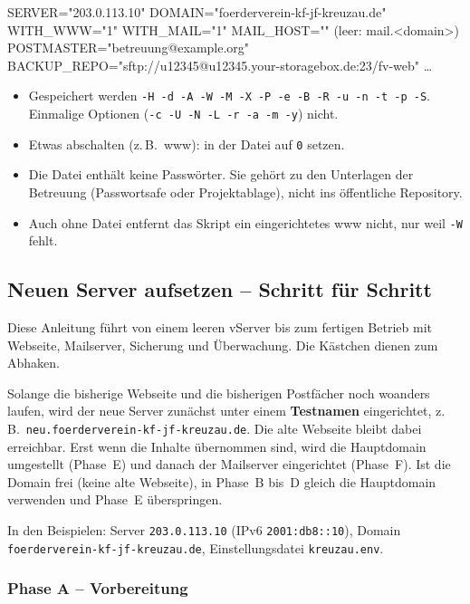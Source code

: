 \documentclass[a4paper,fontsize=10pt]{scrartcl}
\newcommand*{\cmd}[1]{\texttt{#1}}
\newcommand*{\pfad}[1]{\texttt{#1}}
\begin{document}
\begin{befehl}
SERVER="203.0.113.10"
DOMAIN="foerderverein-kf-jf-kreuzau.de"
WITH_WWW="1"
WITH_MAIL="1"
MAIL_HOST=""                       (leer: mail.<domain>)
POSTMASTER="betreuung@example.org"
BACKUP_REPO="sftp://u12345@u12345.your-storagebox.de:23/fv-web"
…
\end{befehl}

\begin{itemize}
  \item Gespeichert werden \cmd{-H -d -A -W -M -X -P -e -B -R -u -n -t -p -S}. Einmalige
        Optionen (\cmd{-c -U -N -L -r -a -m -y}) nicht.
  \item Etwas abschalten (z.\,B.\ www): in der Datei auf \cmd{0} setzen.
  \item Die Datei enthält keine Passwörter. Sie gehört zu den Unterlagen der Betreuung
        (Passwortsafe oder Projektablage), nicht ins öffentliche Repository.
  \item Auch ohne Datei entfernt das Skript ein eingerichtetes www nicht, nur weil
        \cmd{-W} fehlt.
\end{itemize}

\subsection{Neuen Server aufsetzen -- Schritt für Schritt}\label{sec:neu}

Diese Anleitung führt von einem leeren vServer bis zum fertigen Betrieb mit Webseite,
Mailserver, Sicherung und Überwachung. Die Kästchen dienen zum Abhaken.

\begin{dshinweis}[title={Erst unter einem Testnamen, dann umstellen}]
Solange die bisherige Webseite und die bisherigen Postfächer noch woanders laufen,
wird der neue Server zunächst unter einem \textbf{Testnamen} eingerichtet, z.\,B.\
\cmd{neu.foerderverein-kf-jf-kreuzau.de}. Die alte Webseite bleibt dabei erreichbar.
Erst wenn die Inhalte übernommen sind, wird die Hauptdomain umgestellt
(Phase~E) und danach der Mailserver eingerichtet (Phase~F). Ist die Domain frei
(keine alte Webseite), in Phase~B bis~D gleich die Hauptdomain verwenden und
Phase~E überspringen.
\end{dshinweis}

In den Beispielen: Server \cmd{203.0.113.10} (IPv6 \cmd{2001:db8::10}), Domain
\cmd{foerderverein-kf-jf-kreuzau.de}, Einstellungsdatei \pfad{kreuzau.env}.

\subsubsection*{Phase A -- Vorbereitung}
\end{document}
